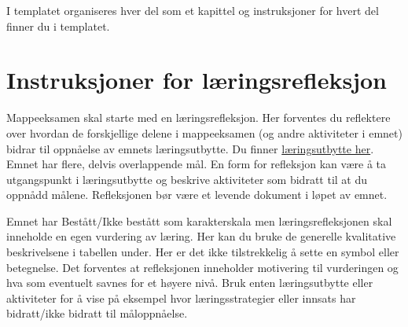 \documentclass[
  letterpaper,
  DIV=11,
  numbers=noendperiod]{scrreprt}
\begin{document}
I templatet organiseres hver del som et kapittel og instruksjoner for
hvert del finner du i templatet.

\hypertarget{instruksjoner-for-luxe6ringsrefleksjon}{%
\section*{Instruksjoner for
læringsrefleksjon}\label{instruksjoner-for-luxe6ringsrefleksjon}}


Mappeeksamen skal starte med en læringsrefleksjon. Her forventes du
reflektere over hvordan de forskjellige delene i mappeeksamen (og andre
aktiviteter i emnet) bidrar til oppnåelse av emnets læringsutbytte. Du
finner
\href{https://studiekatalog.edutorium.no/inn/nb/emne/IDR4000/2023-host}{læringsutbytte
her}. Emnet har flere, delvis overlappende mål. En form for refleksjon
kan være å ta utgangspunkt i læringsutbytte og beskrive aktiviteter som
bidratt til at du oppnådd målene. Refleksjonen bør være et levende
dokument i løpet av emnet.

Emnet har Bestått/Ikke bestått som karakterskala men læringsrefleksjonen
skal inneholde en egen vurdering av læring. Her kan du bruke de
generelle kvalitative beskrivelsene i tabellen under. Her er det ikke
tilstrekkelig å sette en symbol eller betegnelse. Det forventes at
refleksjonen inneholder motivering til vurderingen og hva som eventuelt
savnes for et høyere nivå. Bruk enten læringsutbytte eller aktiviteter
for å vise på eksempel hvor læringsstrategier eller innsats har
bidratt/ikke bidratt til måloppnåelse.
\end{document}
